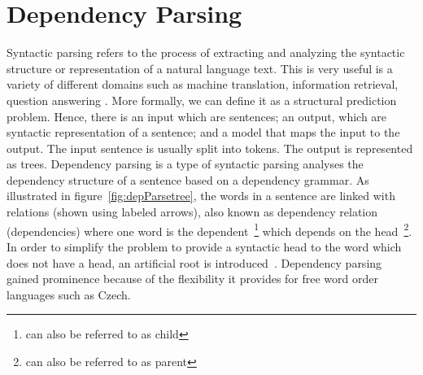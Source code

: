 




\section{Dependency Parsing}%

Syntactic parsing refers to the process of extracting and analyzing the syntactic structure or representation of a natural language text. This is very useful is a variety of different domains such as machine translation, information retrieval, question answering \cite{hall2008transition}. More formally, we can define it as a structural prediction problem. Hence, there is an input which are sentences; an output, which are syntactic representation of a sentence;  and a model that maps the input to the output. The input sentence is usually split into tokens. The output is represented as trees. Dependency parsing is a type of syntactic parsing analyses the dependency structure of a sentence based on a dependency grammar. As illustrated in figure~\ref{fig:depParsetree}, the words in a sentence are linked with relations (shown using labeled arrows), also known as dependency relation (dependencies) where one word is the dependent~\footnote{can also be referred to as child} which depends on the head~\footnote{can also be referred to as parent}. In order to simplify the problem to provide a syntactic head to the word which does not have a head, an artificial root is introduced~\cite{kubler2009dependency}. Dependency parsing gained prominence because of the flexibility it provides for free word order languages such as Czech.

